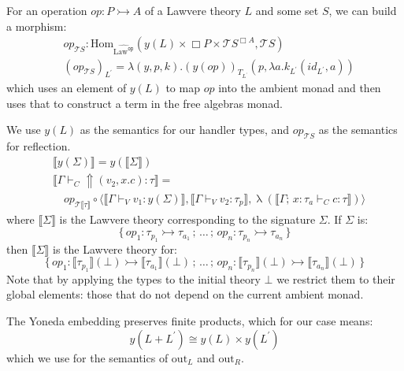 \documentclass[acmsmall, screen, nonacm]{acmart}
\theoremstyle{definition}
\newcommand{\glob}{\mathop{\Box}}
\newcommand{\initial}{\bot}
\newcommand{\lawc}{\mathrm{Law}}
\newcommand{\lawcop}{\lawc^{\mathtt{op}}}
\newcommand{\pshlawcop}{\widehat{\lawcop}}
\newcommand{\yoneda}[1]{y(#1)}
\newcommand{\homset}[3]{\mathrm{Hom}_{#1}(#2, #3)}
\newcommand{\arrow}[2]{{#2}^{#1}}
\newcommand{\sem}[1]{\llbracket #1 \rrbracket}
\newcommand{\reflectname}{\Uparrow}
\newcommand{\performraw}[2]{\mathop{\reflectname(#1(#2))}}
\newcommand{\perform}[5]{\performraw{#1}{#2}(#3, #4. #5)}
\newcommand{\outlname}{\mathrm{out}_L}
\newcommand{\outrname}{\mathrm{out}_R}
\newcommand{\mon}{\mathcal{T}}
\newcommand{\seq}{\,;\,}
\newcommand{\types}{\mathrel{:}}
\newcommand{\ccons}[2]{#1;\,#2}
\newcommand{\lbind}[3]{\ccons{#1}{#2\types#3}}
\newcommand{\turnv}{\mathrel{\vdash_V}}
\newcommand{\turnc}{\mathrel{\vdash_C}}
\newcommand{\currymap}{\mathop{\lambda}}
\begin{document}
For an operation $op \types P \rightarrowtail A$ of a Lawvere theory $L$
and some set $S$, we can build a morphism:
\begin{align*}
&op_{\mon{S}} \types
  \homset{\pshlawcop}
         {\yoneda{L} \times \glob P \times \arrow{\glob A}{\mon{S}}}
         {\mon{S}} \\
&{(op_{\mon{S}})}_{L^\prime}
  = \lambda(y, p, k). (y(op))_{T_{L^\prime}}(p, \lambda a. k_{L^\prime}(id_{L^\prime}, a))
\end{align*}
which uses an element of $\yoneda{L}$ to map $op$ into the ambient monad
and then uses that to construct a term in the free algebras monad.

We use $\yoneda{L}$ as the semantics for our handler types, and
$op_{\mon{S}}$ as the semantics for reflection.
\begin{align*}
&\sem{\yoneda{\Sigma}} = \yoneda{\sem{\Sigma}} \\
&\sem{\Gamma \turnc \perform{v_1}{op}{v_2}{x}{c} \types \tau} = \\
&\quad op_{\mon{\sem{\tau}}}
       \circ \langle \sem{\Gamma \turnv v_1 \types \yoneda{\Sigma}},
                      \sem{\Gamma \turnv v_2 \types \tau_p},
                      \currymap(\sem{\lbind{\Gamma}{x}{\tau_a} \turnc c \types \tau})
             \rangle
\end{align*}
where $\sem{\Sigma}$ is the Lawvere theory corresponding to the
signature $\Sigma$. If $\Sigma$ is:
\begin{equation*}
  \{ \, op_1 \types \tau_{p_1} \rightarrowtail \tau_{a_1} \seq
  \ldots \seq
  op_n \types \tau_{p_n} \rightarrowtail \tau_{a_n} \, \}
\end{equation*}
then $\sem{\Sigma}$ is the Lawvere theory for:
\begin{equation*}
  \{ \, op_1 \types \sem{\tau_{p_1}}(\initial)
                    \rightarrowtail \sem{\tau_{a_1}}(\initial) \seq
  \ldots \seq
  op_n \types \sem{\tau_{p_n}}(\initial)
              \rightarrowtail \sem{\tau_{a_n}}(\initial) \, \}
\end{equation*}
Note that by applying the types to the initial theory $\initial$ we
restrict them to their global elements: those that do not depend on the
current ambient monad.

The Yoneda embedding preserves finite products, which for our case
means:
\begin{equation*}
\yoneda{L + L^{\prime}} \cong \yoneda{L} \times \yoneda{L^{\prime}}
\end{equation*}
which we use for the semantics of $\outlname$ and $\outrname$.
\end{document}
